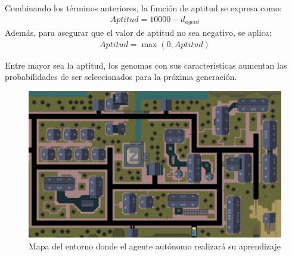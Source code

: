 \documentclass[lettersize, journal]{IEEEtran}
\begin{document}
Combinando los términos anteriores, la función de aptitud se expresa como:
\begin{align*} 
Aptitud = 10000 - d_{agent} 
\end{align*}
Además, para asegurar que el valor de aptitud no sea negativo, se aplica:
\begin{align*} 
Aptitud = \max(0, Aptitud) 
\end{align*}

Entre mayor sea la aptitud, los genomas con sus características aumentan las probabilidades de ser seleccionados para la próxima generación.
\begin{figure}
    \centering
    \includegraphics[scale=0.14]{images/gta2.png}
    \caption{Mapa del entorno donde el agente autónomo realizará su aprendizaje}
    \label{fig:Mapa}
\end{figure} 
\end{document}
